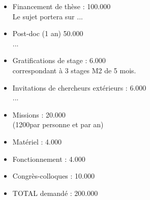 \documentclass[14pt,fleqn]{article}
\begin{document}
\begin{itemize}

\item Financement de thèse : \hfill 100.000 \EUR\\
{\footnotesize Le sujet portera sur ...}
\item Post-doc (1 an) \hfill 50.000 \EUR\\
{\footnotesize ...}
\item Gratifications de stage : \hfill 6.000 \EUR\\
{\footnotesize correspondant à 3 stages M2 de 5 mois.}
\item Invitations de chercheurs extérieurs : \hfill 6.000 \EUR\\
{\footnotesize ...
}
\item Missions : \hfill 20.000 \EUR\\
{\footnotesize (1200\EUR par personne et par an)}
\item Matériel : \hfill 4.000 \EUR
\item Fonctionnement : \hfill 4.000 \EUR
\item Congrès-colloques :  \hfill 10.000 \EUR
\item TOTAL demandé : \hfill 200.000 \EUR
\end{itemize}


  

  
\end{document}
